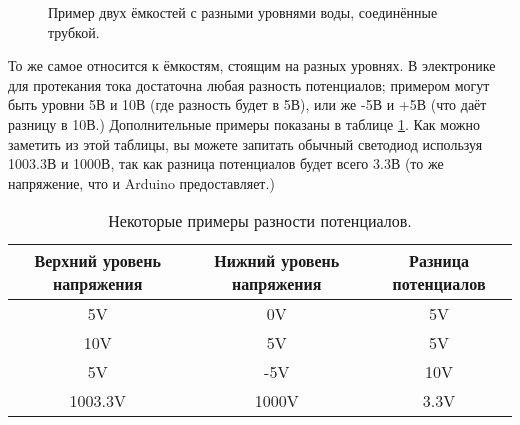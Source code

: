\documentclass[../sparc.tex]{subfiles}
\begin{document}
\begin{figure}[ht]
  \centering
  \caption{Пример двух ёмкостей с разными уровнями воды, соединённые трубкой.}
  \label{fig:electronics-circuits-3}
\end{figure}

То же самое относится к ёмкостям, стоящим на разных уровнях.  В электронике для
протекания тока достаточна любая разность потенциалов; примером могут быть
уровни 5В и 10В (где разность будет в 5В), или же -5В и +5В (что даёт разницу в
10В.)  Дополнительные примеры показаны в таблице
\ref{table:electronics-potential-difference}.  Как можно заметить из этой
таблицы, вы можете запитать обычный светодиод используя 1003.3В и 1000В, так как
разница потенциалов будет всего 3.3В (то же напряжение, что и Arduino
предоставляет.)

\begin{table}[h]
  \centering
  \begin{tabular}{c | c | c}
    Верхний уровень напряжения & Нижний уровень напряжения & Разница потенциалов \\
    \hline
    5V & 0V & 5V \\
    \hline
    10V & 5V & 5V \\
    \hline
    5V & -5V & 10V \\
    \hline
    1003.3V & 1000V & 3.3V \\
    \hline
  \end{tabular}
  \caption{Некоторые примеры разности потенциалов.}
  \label{table:electronics-potential-difference}
\end{table}
\end{document}
